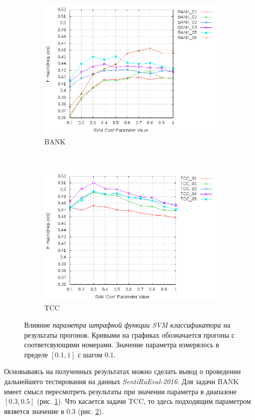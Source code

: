 \begin{figure}[!htp] \centering
    \captionsetup[subfigure]{justification=centering}
    \begin{subfigure}[b]{0.45\textwidth}
        \includegraphics[width=\textwidth]{pics/2015_bank_balanced.png}
        \caption{BANK}
        \label{fig:bank_cost_changes}
    \end{subfigure}
    ~
    \begin{subfigure}[b]{0.45\textwidth}
        \includegraphics[width=\textwidth]{pics/2015_ttk_balanced.png}
        \caption{TCC}
        \label{fig:ttk_cost_changes}
    \end{subfigure}
    \caption{
        Влияние {\it параметра штрафной функции SVM классификатора}
        на результаты прогонов.
        Кривыми на графиках обозначается прогоны с соответсвующими номерами.
        Значение параметра измерялось в пределе $[0.1, 1]$ с шагом $0.1$.
    }
    \label{fig:cost}
\end{figure}

Основываясь на полученных результатах можно сделать вывод о проведении дальнейшего
тестирования на данных {\it SentiRuEval-2016}.
Для задачи BANK имеет смысл пересмотреть результаты при значении параметра в
диапазоне $[0.3, 0.5]$ (рис. \ref{fig:bank_cost_changes}).
Что касается задачи TCC, то здесь подходящим параметром явзяется значение в $0.3$
(рис. \ref{fig:ttk_cost_changes}).
